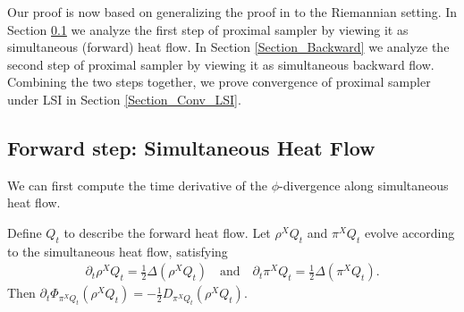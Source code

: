 Our proof is now based on generalizing the proof in \cite{chen2022improved} to the Riemannian setting. 
In Section \ref{Section_Forward} we analyze the first step of proximal sampler by viewing it as simultaneous (forward) heat flow. In Section \ref{Section_Backward} we analyze the second step of proximal sampler by viewing it as simultaneous backward flow. Combining the two steps together, we prove convergence of proximal sampler under LSI in Section \ref{Section_Conv_LSI}.

\subsection{Forward step: Simultaneous Heat Flow}\label{Section_Forward}

We can first compute the time derivative of the $\phi$-divergence along simultaneous heat flow. 
\begin{lemma}\label{lem:lemma2}
    \label{Lemma_Forward_Riemannian} Define $Q_{t}$ to describe the forward heat flow. 
    Let $\rho^{X}Q_{t}$ and $\pi^{X} Q_{t}$ evolve according to the simultaneous heat flow, satisfying
    \begin{align*}
            \partial_{t} \rho^{X} Q_{t} = \frac{1}{2} \Delta (\rho^{X} Q_{t}) \quad\text{and}\quad
            \partial_{t} \pi^{X} Q_{t} = \frac{1}{2} \Delta (\pi^{X} Q_{t}).
    \end{align*}
    Then $\partial_{t} \Phi_{\pi^{X} Q_{t}} (\rho^{X}Q_{t}) = - \frac{1}{2} D_{\pi^{X} Q_{t}} (\rho^{X} Q_{t})$.
\end{lemma}
